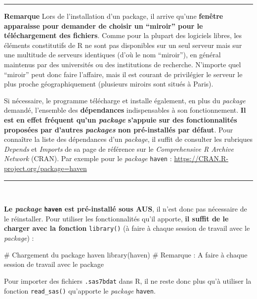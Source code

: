 \documentclass[12pt,twosided, notitlepage]{book}
\newenvironment{Shaded}{}{}
\newcommand{\CommentTok}[1]{\textcolor[rgb]{0.00,0.50,0.00}{#1}}
\newcommand{\KeywordTok}[1]{\textcolor[rgb]{0.00,0.00,1.00}{#1}}
\newcommand{\NormalTok}[1]{#1}
\renewenvironment{Shaded}{\begin{snugshade}}{\end{snugshade}}
\begin{document}
\begin{center}\rule{0.5\linewidth}{\linethickness}\end{center}

\textbf{Remarque} Lors de l'installation d'un package, il arrive qu'une
\textbf{fenêtre apparaisse pour demander de choisir un \enquote{miroir}
pour le téléchargement des fichiers}. Comme pour la plupart des
logiciels libres, les éléments constitutifs de R ne sont pas disponibles
sur un seul serveur mais sur une multitude de serveurs identiques (d'où
le nom \enquote{miroir}), en général maintenus par des universités ou
des institutions de recherche. N'importe quel \enquote{miroir} peut donc
faire l'affaire, mais il est courant de privilégier le serveur le plus
proche géographiquement (plusieurs miroirs sont situés à Paris).

Si nécessaire, le programme télécharge et installe également, en plus du
\emph{package} demandé, l'ensemble des \textbf{dépendances}
indispensables à son fonctionnement. \textbf{Il est en effet fréquent
qu'un \emph{package} s'appuie sur des fonctionnalités proposées par
d'autres \emph{packages} non pré-installés par défaut}. Pour connaître
la liste des dépendances d'un \emph{package}, il suffit de consulter les
rubriques \emph{Depends} et \emph{Imports} de sa page de référence sur
le \emph{Comprehensive R Archive Network} (CRAN). Par exemple pour le
\emph{package} \texttt{haven} :
\url{https://CRAN.R-project.org/package=haven}

\begin{center}\rule{0.5\linewidth}{\linethickness}\end{center}

~

\textbf{Le \emph{package} \texttt{haven} est pré-installé sous AUS}, il
n'est donc pas nécessaire de le réinstaller. Pour utiliser les
fonctionnalités qu'il apporte, \textbf{il suffit de le charger avec la
fonction} \texttt{library()} (à faire à
chaque session de travail avec le \emph{package}) :

\begin{Shaded}
\begin{Highlighting}[]
\CommentTok{# Chargement du package haven}
\KeywordTok{library}\NormalTok{(haven)}
\CommentTok{# Remarque : A faire à chaque session de travail avec le package}
\end{Highlighting}
\end{Shaded}

Pour importer des fichiers \texttt{.sas7bdat} dans R, il ne reste donc
plus qu'à utiliser la fonction
\texttt{read\_sas()} qu'apporte le
\emph{package} \texttt{haven}.
\end{document}
